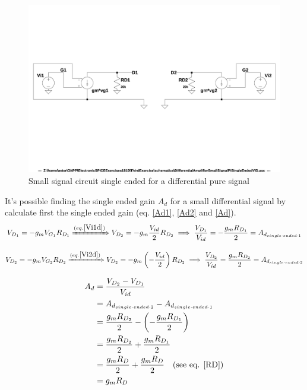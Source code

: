 \documentclass[10pt,a4paper]{book}
\begin{document}
\begin{figure}[h]
  \centering
  \includegraphics[width=12cm]{schematics/DifferentialAmplifierSmallSignalPiSingleEndedVID.jpg}
  \caption{Small signal circuit single ended for a differential pure signal}
  \label{PiSingle2}
\end{figure}

It's possible finding the single ended gain $A_d$ for a small differential signal by calculate first the single ended gain (eq. \ref{Ad1}, \ref{Ad2} and \ref{Ad}).\\

\begin{align}
V_{D_1} = - g_m V_{G_1} R_{D_1} \xRightarrow{(eq. \ref{Vi1d})}
V_{D_2} = - g_m \frac{V_{id}}{2} R_{D_2} \implies
\frac{V_{D_1}}{V_{id}} = - \frac{g_m R_{D_1}}{2} = A_{d_{single\cdot ended\cdot 1}}\label{Ad1}
\end{align}

\begin{align}
V_{D_2} = - g_m V_{G_2} R_{D_2} \xRightarrow{(eq. \ref{Vi2d})}
V_{D_2} = - g_m \left(-\frac{V_{id}}{2}\right) R_{D_2} \implies
\frac{V_{D_2}}{V_{id}} = \frac{g_m R_{D_2}}{2} = A_{d_{single\cdot ended\cdot 2}}\label{Ad2}
\end{align}

\begin{align}
A_d &= \frac{V_{D_2} - V_{D_1}}{V_{id}}\\
&= A_{d_{single\cdot ended\cdot 2}} - A_{d_{single\cdot ended\cdot 1}}\\
&= \frac{g_m R_{D_2}}{2} - \left(- \frac{g_m R_{D_1}}{2} \right)\\
&= \frac{g_m R_{D_2}}{2} + \frac{g_m R_{D_1}}{2}\\
&= \frac{g_m R_{D}}{2} + \frac{g_m R_{D}}{2} \quad \text{(see eq. \ref{RD})}\\
&= g_m R_{D} \label{Ad}
\end{align}
\end{document}
